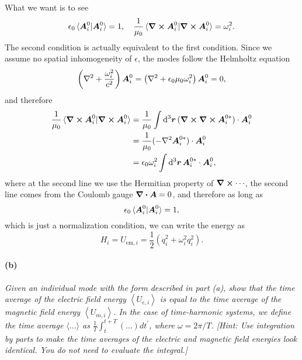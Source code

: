 \documentclass[hyperref, a4paper]{article}
\begin{document}
What we want is to see 
\begin{equation}
    \epsilon_0 \braket*{\vb*{A}_i^0}{\vb*{A}_i^0} = 1, \quad 
    \frac{1}{\mu_0} \braket*{\curl{\vb*{A}_i^0}}{\curl{\vb*{A}_i^0}} = \omega_i^2.
\end{equation}
The second condition is actually equivalent to the first condition.
Since we assume no spatial inhomogeneity of $\epsilon$, 
the modes follow the Helmholtz equation 
\begin{equation}
    \left( \laplacian + \frac{\omega_i^2}{c^2} \right) \vb*{A}_i^0 = 
    \left( \laplacian + \epsilon_0 \mu_0 \omega_i^2 \right) \vb*{A}_i^0 = 0, 
\end{equation}
and therefore 
\begin{equation}
    \begin{aligned}
        \frac{1}{\mu_0} \braket*{\curl{\vb*{A}_i^0}}{\curl{\vb*{A}_i^0}}
        &= \frac{1}{\mu_0} \int \dd[3]{\vb*{r}} (\curl{\curl{\vb*{A}_i^{0*}}}) \cdot \vb*{A}_i^0 \\
        &= \frac{1}{\mu_0} (- \laplacian \vb*{A}_i^{0*}) \cdot \vb*{A}_i^0 \\
        &= \epsilon_0 \omega_i^2 \int \dd[3]{\vb*{r}} \vb*{A}_i^{0*} \cdot \vb*{A}_i^0,  
    \end{aligned}
\end{equation}
where at the second line we use the Hermitian property of $\curl{\cdots}$, 
the second line comes from the Coulomb gauge $\div{\vb*{A}} = 0$, 
and therefore as long as 
\begin{equation}
    \epsilon_0 \braket*{\vb*{A}_i^0}{\vb*{A}_i^0} = 1, 
\end{equation}
which is just a normalization condition, we can write the energy as 
\begin{equation}
    H_i = U_{\text{em}, i} = \frac{1}{2} (\dot{q}_i^2 + \omega_i^2 q_i^2).
\end{equation}

\paragraph*{(b)} \textit{Given an individual mode with the form described in part (a), show that the time average of the electric field energy $\left\langle U_{e, i}\right\rangle$ is equal to the time average of the magnetic field energy $\left\langle U_{m, i}\right\rangle$. In the case of time-harmonic systems, we define the time average $\langle\ldots\rangle$ as $\frac{1}{T} \int_t^{t+T}(\ldots) d t^{\prime}$, where $\omega=2 \pi / T$. [Hint: Use integration by parts to make the time averages of the electric and magnetic field energies look identical. You do not need to evaluate the integral.]}
\end{document}
